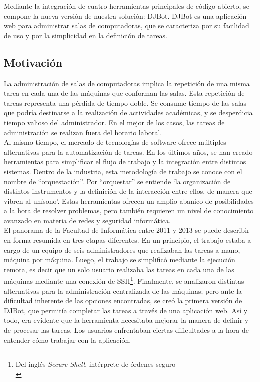 \documentclass[a4paper,12pt]{article}
\begin{document}
Mediante la integración de cuatro herramientas principales de código abierto, se compone la nueva versión de nuestra solución: DJBot. DJBot es una aplicación web para administrar salas de computadoras, que se caracteriza por su facilidad de uso y por la simplicidad en la definición de tareas.\\

\subsection{Motivación}
\label{sec:orgheadline1}

La administración de salas de computadoras implica la repetición de una misma tarea en cada una de las máquinas que conforman las salas. Esta repetición de tareas representa una pérdida de tiempo doble. Se consume tiempo de las salas que podría destinarse a la realización de actividades académicas, y se desperdicia tiempo valioso del administrador. En el mejor de los casos, las tareas de administración se realizan fuera del horario laboral.\\


Al mismo tiempo, el mercado de tecnologías de software ofrece múltiples alternativas para la automatización de tareas. En los últimos años, se han creado herramientas para simplificar el flujo de trabajo y la integración entre distintos sistemas. Dentro de la industria, esta metodología de trabajo se conoce con el nombre de “orquestación”. Por “orquestar” se entiende ‘la organización de distintos instrumentos y la definición de la interacción entre ellos, de manera que vibren al unísono’. Estas herramientas ofrecen un amplio abanico de posibilidades a la hora de resolver problemas, pero también requieren un nivel de conocimiento avanzado en materia de redes y seguridad informática.\\

El panorama de la Facultad de Informática entre 2011 y 2013 se puede describir en forma resumida en tres etapas diferentes. En un principio, el trabajo estaba a cargo de un equipo de seis administradores que realizaban las tareas a mano, máquina por máquina. Luego, el trabajo se simplificó mediante la ejecución remota, es decir que un solo usuario realizaba las tareas en cada una de las máquinas mediante una conexión de SSH\footnote{Del inglés \emph{Secure Shell}, intérprete de órdenes seguro\\}. Finalmente, se analizaron distintas alternativas para la administración centralizada de las máquinas; pero ante la dificultad inherente de las opciones encontradas, se creó la primera versión de DJBot, que permitía completar las tareas a través de una aplicación web. Así y todo, era evidente que la herramienta necesitaba mejorar la manera de definir y de procesar las tareas. Los usuarios enfrentaban ciertas dificultades a la hora de entender cómo trabajar con la aplicación.\\
\end{document}
